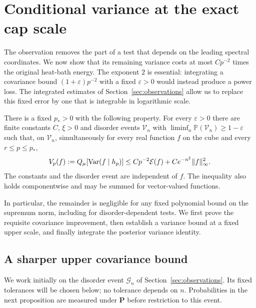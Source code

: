 \section{Conditional variance at the exact cap scale}\label{sec:variance}

The observation removes the part of a test that depends on the leading
spectral coordinates. We now show that its remaining variance costs at most
$Cp^{-2}$ times the original heat-bath energy. The exponent $2$ is essential:
integrating a covariance bound $(1+\varepsilon)p^{-2}$ with a fixed
$\varepsilon>0$ would instead produce a power loss. The integrated estimates
of Section~\ref{sec:observations} allow us to replace this fixed error by
one that is integrable in logarithmic scale.

\begin{proposition}\label{prop:variance-main}
There is a fixed $p_*>0$ with the following property. For every
$\varepsilon>0$ there are finite constants $C$, $\xi>0$ and disorder events
$\mathcal V_n$ with $\liminf_n\mathbb P(\mathcal V_n)\ge1-\varepsilon$
such that, on $\mathcal V_n$, simultaneously for every real function $f$
on the cube and every $r\le p\le p_*$,
\begin{equation}\label{eq:source-16}
 V_p(f):=Q_\mu[\operatorname{Var}(f\mid h_p)]
 \le Cp^{-2}\mathcal E(f)+Ce^{-n^\xi}\|f\|_\infty^2.
\end{equation}
The constants and the disorder event are independent of $f$. The inequality
also holds componentwise and may be summed for vector-valued functions.
\end{proposition}

In particular, the remainder is negligible for any fixed polynomial bound
on the supremum norm, including for disorder-dependent tests. We first
prove the requisite covariance improvement, then establish a variance bound
at a fixed upper scale, and finally integrate the posterior variance identity.

\subsection{A sharper upper covariance bound}

We work initially on the disorder event $\mathcal G_n$ of
Section~\ref{sec:observations}. Its fixed tolerances will be chosen below;
no tolerance depends on $n$. Probabilities in the next proposition are
measured under $\mathbf P$ before restriction to this event.

